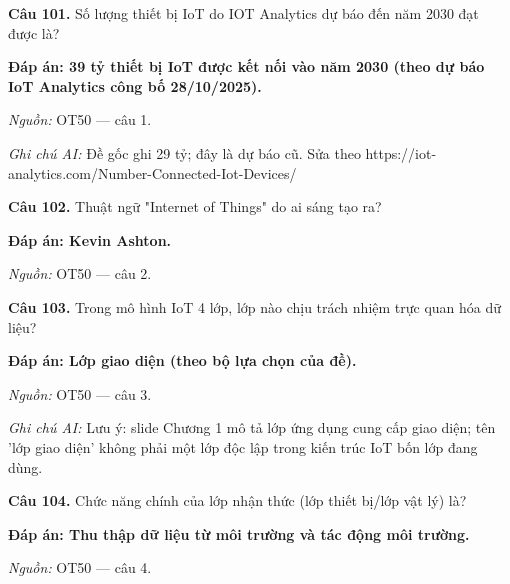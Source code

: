 \documentclass[11pt,a4paper]{article}
\begin{document}
\textbf{Câu 101.} Số lượng thiết bị IoT do IOT Analytics dự báo đến năm 2030 đạt được là?\par
{\color{answer}\textbf{Đáp án: 39 tỷ thiết bị IoT được kết nối vào năm 2030 (theo dự báo IoT Analytics công bố 28/10/2025).}}\par
{\footnotesize\color{sourcegray}\textit{Nguồn:} OT50 — câu 1.\par}
{\footnotesize\color{sourcegray}\textit{Ghi chú AI:} Đề gốc ghi 29 tỷ; đây là dự báo cũ. Sửa theo https://iot-analytics.com/Number-Connected-Iot-Devices/\par}
\vspace{3pt}\par\noindent{\color{black!18}\rule{\linewidth}{0.3pt}}\par\medskip

\textbf{Câu 102.} Thuật ngữ "Internet of Things" do ai sáng tạo ra?\par
{\color{answer}\textbf{Đáp án: Kevin Ashton.}}\par
{\footnotesize\color{sourcegray}\textit{Nguồn:} OT50 — câu 2.\par}
\vspace{3pt}\par\noindent{\color{black!18}\rule{\linewidth}{0.3pt}}\par\medskip

\textbf{Câu 103.} Trong mô hình IoT 4 lớp, lớp nào chịu trách nhiệm trực quan hóa dữ liệu?\par
{\color{answer}\textbf{Đáp án: Lớp giao diện (theo bộ lựa chọn của đề).}}\par
{\footnotesize\color{sourcegray}\textit{Nguồn:} OT50 — câu 3.\par}
{\footnotesize\color{sourcegray}\textit{Ghi chú AI:} Lưu ý: slide Chương 1 mô tả lớp ứng dụng cung cấp giao diện; tên 'lớp giao diện' không phải một lớp độc lập trong kiến trúc IoT bốn lớp đang dùng.\par}
\vspace{3pt}\par\noindent{\color{black!18}\rule{\linewidth}{0.3pt}}\par\medskip

\textbf{Câu 104.} Chức năng chính của lớp nhận thức (lớp thiết bị/lớp vật lý) là?\par
{\color{answer}\textbf{Đáp án: Thu thập dữ liệu từ môi trường và tác động môi trường.}}\par
{\footnotesize\color{sourcegray}\textit{Nguồn:} OT50 — câu 4.\par}
\vspace{3pt}\par\noindent{\color{black!18}\rule{\linewidth}{0.3pt}}\par\medskip
\end{document}
